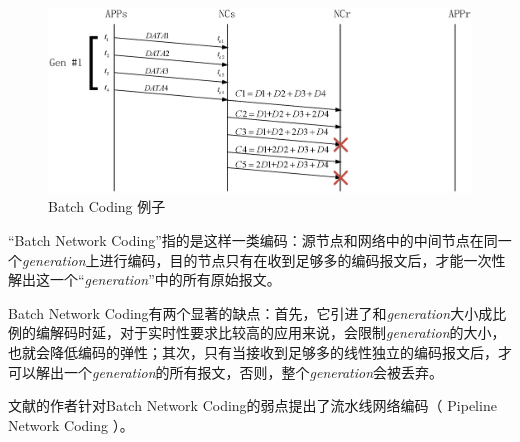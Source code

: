 \begin{figure}[htbp]
\centering
\includegraphics[width=6in]{figures/batchundecode.eps}
\caption{Batch Coding 例子}
\label{BATCHUNDECODE_EPS}
\end{figure}
\par
“Batch Network Coding”指的是这样一类编码：源节点和网络中的中间节点在同一个\emph{generation}上进行编码，目的节点只有在收到足够多的编码报文后，才能一次性解出这一个“\emph{generation}”中的所有原始报文。 
\par
Batch Network Coding有两个显著的缺点：首先，它引进了和\emph{generation}大小成比例的编解码时延，对于实时性要求比较高的应用来说，会限制\emph{generation}的大小，也就会降低编码的弹性；其次，只有当接收到足够多的线性独立的编码报文后，才可以解出一个\emph{generation}的所有报文，否则，整个\emph{generation}会被丢弃。
\par
文献\cite{chen2010pipeline}的作者针对Batch Network Coding的弱点提出了流水线网络编码（ Pipeline  Network Coding ）。
